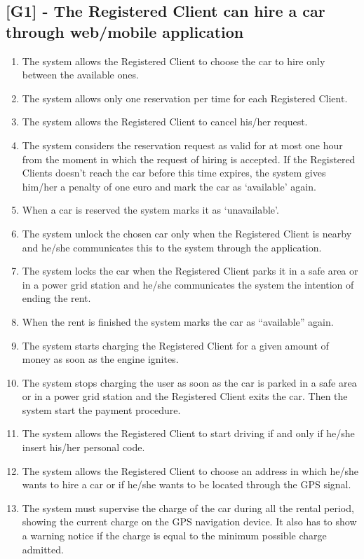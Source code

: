 \subsection{ [G1] - The Registered Client can hire a car through web/mobile application}
\begin{enumerate}[label=R1.\arabic*]
\item The system allows the Registered Client to choose the car to hire only between the available ones.
\item The system allows only one reservation per time for each Registered Client.
\item The system allows the Registered Client to cancel his/her request.
\item The system considers the reservation request as valid for at most one hour from the moment in which the request of hiring is accepted.
If the Registered Clients doesn’t reach the car before this time expires, the system gives him/her a penalty of one euro and mark the car as ‘available’ again.
\item When a car is reserved the system marks it as ‘unavailable’.
\item The system unlock the chosen car only when the Registered Client is nearby and he/she communicates this to the system through the application.
\item The system locks the car when the Registered Client parks it in a safe area or in a power grid station and he/she communicates the system the intention of ending the rent.
\item When the rent is finished the system marks the car as “available” again.
\item The system starts charging the Registered Client for a given amount of money as soon as the engine ignites.
\item The system stops charging the user as soon as the car is parked in a safe area or in a power grid station and the Registered Client exits the car.
Then the system start the payment procedure.
\item The system allows the Registered Client to start driving if and only if he/she insert his/her personal code.
\item The system allows the Registered Client to choose an address in which he/she wants to hire a car or if he/she wants to be located through the GPS signal.
\item The system must supervise the charge of the car during all the rental period, showing the current charge on the GPS navigation device.
It also has to show a warning notice if the charge is equal to the minimum possible charge admitted.
\end{enumerate}

